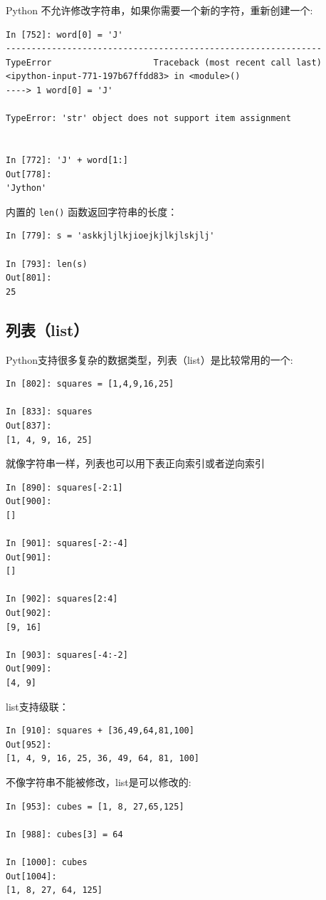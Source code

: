 \documentclass[10pt,a4paper,UTF8]{article}
\begin{document}
Python 不允许修改字符串，如果你需要一个新的字符，重新创建一个:
\lstset{language=Python,label= ,caption= ,captionpos=b,numbers=none}
\begin{lstlisting}
In [752]: word[0] = 'J'
--------------------------------------------------------------
TypeError                    Traceback (most recent call last)
<ipython-input-771-197b67ffdd83> in <module>()
----> 1 word[0] = 'J'

TypeError: 'str' object does not support item assignment


In [772]: 'J' + word[1:]
Out[778]: 
'Jython'
\end{lstlisting}
内置的 \texttt{len()} 函数返回字符串的长度：
\lstset{language=Python,label= ,caption= ,captionpos=b,numbers=none}
\begin{lstlisting}
In [779]: s = 'askkjljlkjioejkjlkjlskjlj'

In [793]: len(s)
Out[801]: 
25
\end{lstlisting}
\subsection{列表（list）}
\label{sec:orgheadline6}

Python支持很多复杂的数据类型，列表（list）是比较常用的一个:

\lstset{language=Python,label= ,caption= ,captionpos=b,numbers=none}
\begin{lstlisting}
In [802]: squares = [1,4,9,16,25]

In [833]: squares
Out[837]: 
[1, 4, 9, 16, 25]
\end{lstlisting}
就像字符串一样，列表也可以用下表正向索引或者逆向索引
\lstset{language=Python,label= ,caption= ,captionpos=b,numbers=none}
\begin{lstlisting}
In [890]: squares[-2:1]
Out[900]: 
[]

In [901]: squares[-2:-4]
Out[901]: 
[]

In [902]: squares[2:4]
Out[902]: 
[9, 16]

In [903]: squares[-4:-2]
Out[909]: 
[4, 9]
\end{lstlisting}
list支持级联：
\lstset{language=Python,label= ,caption= ,captionpos=b,numbers=none}
\begin{lstlisting}
In [910]: squares + [36,49,64,81,100]
Out[952]: 
[1, 4, 9, 16, 25, 36, 49, 64, 81, 100]
\end{lstlisting}
不像字符串不能被修改，list是可以修改的:
\lstset{language=Python,label= ,caption= ,captionpos=b,numbers=none}
\begin{lstlisting}
In [953]: cubes = [1, 8, 27,65,125]

In [988]: cubes[3] = 64

In [1000]: cubes
Out[1004]: 
[1, 8, 27, 64, 125]
\end{lstlisting}
\end{document}

